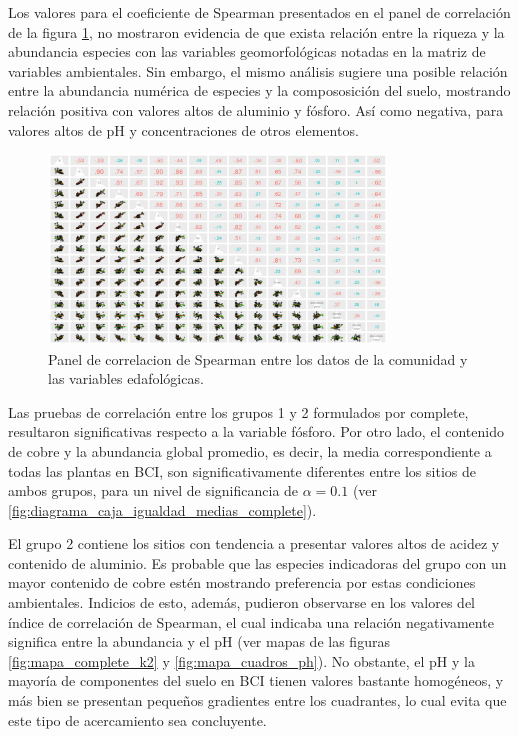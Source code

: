 \documentclass[11pt,]{article}
\begin{document}
Los valores para el coeficiente de Spearman presentados en el panel de
correlación de la figura \ref{fig:panel_cor_suelo_abun_riq_rubic_spear},
no mostraron evidencia de que exista relación entre la riqueza y la
abundancia especies con las variables geomorfológicas notadas en la
matriz de variables ambientales. Sin embargo, el mismo análisis sugiere
una posible relación entre la abundancia numérica de especies y la
compososición del suelo, mostrando relación positiva con valores altos
de aluminio y fósforo. Así como negativa, para valores altos de pH y
concentraciones de otros elementos.

\begin{figure}
\centering
\includegraphics[width=0.80000\textwidth]{panel_cor_suelo_abun_riq_rubic_spear.png}
\caption{Panel de correlacion de Spearman entre los datos de la
comunidad y las variables edafológicas.
\label{fig:panel_cor_suelo_abun_riq_rubic_spear}}
\end{figure}

Las pruebas de correlación entre los grupos 1 y 2 formulados por
complete, resultaron significativas respecto a la variable fósforo. Por
otro lado, el contenido de cobre y la abundancia global promedio, es
decir, la media correspondiente a todas las plantas en BCI, son
significativamente diferentes entre los sitios de ambos grupos, para un
nivel de significancia de \(\alpha= 0.1\) (ver
\ref{fig:diagrama_caja_igualdad_medias_complete}).

El grupo 2 contiene los sitios con tendencia a presentar valores altos
de acidez y contenido de aluminio. Es probable que las especies
indicadoras del grupo con un mayor contenido de cobre estén mostrando
preferencia por estas condiciones ambientales. Indicios de esto, además,
pudieron observarse en los valores del índice de correlación de
Spearman, el cual indicaba una relación negativamente significa entre la
abundancia y el pH (ver mapas de las figuras \ref{fig:mapa_complete_k2}
y \ref{fig:mapa_cuadros_ph}). No obstante, el pH y la mayoría de
componentes del suelo en BCI tienen valores bastante homogéneos, y más
bien se presentan pequeños gradientes entre los cuadrantes, lo cual
evita que este tipo de acercamiento sea concluyente.
\end{document}
